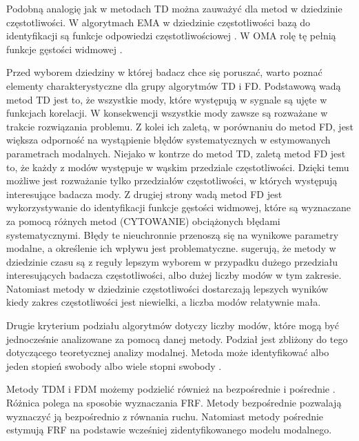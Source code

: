 Podobną analogię jak w metodach TD można zauważyć dla metod w dziedzinie częstotliwości. W algorytmach EMA w dziedzinie częstotliwości bazą do identyfikacji są funkcje odpowiedzi częstotliwościowej . W OMA rolę tę pełnią funkcje gęstości widmowej .

Przed wyborem dziedziny w której badacz chce się poruszać, warto poznać elementy charakterystyczne dla grupy algorytmów TD i FD. Podstawową wadą metod TD jest to, że wszystkie mody, które występują w sygnale są ujęte w funkcjach korelacji. W konsekwencji wszystkie mody zawsze są rozważane w trakcie rozwiązania problemu. Z kolei ich zaletą, w porównaniu do metod FD, jest większa odporność na wystąpienie błędów systematycznych w estymowanych parametrach modalnych. Niejako w kontrze do metod TD, zaletą metod FD jest to, że każdy z modów występuje w wąskim przedziale częstotliwości. Dzięki temu możliwe jest rozważanie tylko przedziałów częstotliwości, w których występują interesujące badacza mody. Z drugiej strony wadą metod FD jest wykorzystywanie do identyfikacji funkcje gęstości widmowej, które są wyznaczane za pomocą różnych metod (CYTOWANIE) obciążonych błędami systematycznymi. Błędy te nieuchronnie przenoszą się na wynikowe parametry modalne, a określenie ich wpływu jest problematyczne. \cite{Maia1997} sugerują, że metody w dziedzinie czasu są z reguły lepszym wyborem w przypadku dużego przedziału interesujących badacza częstotliwości, albo dużej liczby modów w tym zakresie. Natomiast metody w dziedzinie częstotliwości dostarczają lepszych wyników kiedy zakres częstotliwości jest niewielki, a liczba modów relatywnie mała. 

Drugie kryterium podziału algorytmów dotyczy liczby modów, które mogą być jednocześnie analizowane za pomocą danej metody. Podział jest zbliżony do tego dotyczącego teoretycznej analizy modalnej. Metoda może identyfikować albo jeden stopień swobody  albo wiele stopni swobody .

Metody TDM i FDM możemy podzielić również na bezpośrednie  i pośrednie . Różnica polega na sposobie wyznaczania FRF. Metody bezpośrednie pozwalają wyznaczyć ją bezpośrednio z równania ruchu. Natomiast metody pośrednie estymują FRF na podstawie wcześniej zidentyfikowanego modelu modalnego.

